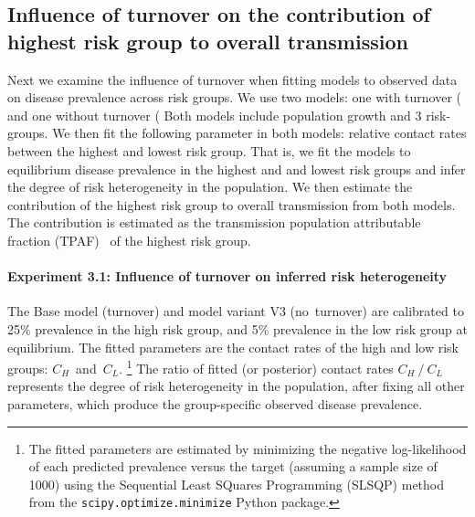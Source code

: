 \subsection{Influence of turnover on the contribution of highest risk group to overall transmission }\label{ss:exp-turnover-fit}
Next we examine the influence of turnover when fitting models to observed data
on disease prevalence across risk groups. We use two models: one with turnover (%
and one without turnover (%
Both models include population growth and 3 risk-groups.
We then fit the following parameter in both models: relative contact rates between the highest and lowest risk group. %
That is, we fit the models to equilibrium disease prevalence in the highest and and lowest risk groups  %
and infer the degree of risk heterogeneity in the population. We then estimate the contribution of the highest risk group to overall transmission from both models.  %
The contribution is estimated as the transmission population attributable fraction (TPAF)~\citep{Mishra2016}
of the highest risk group.
\paragraph{Experiment 3.1: Influence of turnover on inferred risk heterogeneity}  
The Base model (turnover) and model variant V3 (no~turnover) are calibrated to
25\% prevalence in the high risk group, and
5\% prevalence in the low risk group at equilibrium.  %
The fitted parameters are
the contact rates of the high and low risk groups: $C_H$~and~$C_L$.%
\footnote{The fitted parameters are estimated by minimizing
  the negative log-likelihood of each predicted prevalence versus the target
  (assuming a sample size of 1000)
  using the Sequential Least SQuares Programming (SLSQP) method~\citep{Kraft1988}
  from the \texttt{scipy.optimize.minimize} Python package.}
The ratio of fitted (or posterior) contact rates $C_H~/~C_L$
represents the degree of risk heterogeneity in the population, after fixing all other parameters,   
which produce the group-specific observed disease prevalence.
